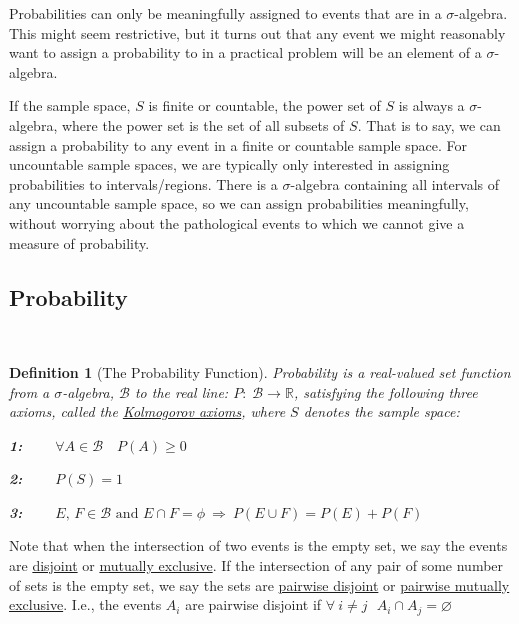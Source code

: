 \documentclass[12pt,a4paper]{article}
\newtheorem{defn}[thm]{Definition}
\begin{document}
Probabilities can only be meaningfully assigned to events that are in a $\sigma$-algebra. This might seem restrictive, but it turns out that any event we might reasonably want to assign a probability to in a practical problem will be an element of a $\sigma$-algebra.

If the sample space, $S$ is finite or countable, the power set of $S$ is always a $\sigma$-algebra, where the power set is the set of all subsets of $S$. That is to say, we can assign a probability to any event in a finite or countable sample space. For uncountable sample spaces, we are typically only interested in assigning probabilities to intervals/regions. There is a $\sigma$-algebra containing all intervals of any uncountable sample space, so we can assign probabilities meaningfully, without worrying about the pathological events to which we cannot give a measure of probability.\par
\vspace{12pt}


\subsection{Probability}$\;$

\begin{defn}[The Probability Function]

Probability is a real-valued set function from a $\sigma$-algebra, $\mathcal{B}$ to the real line: $P:\;\mathcal{B}\rightarrow\mathbb{R}$, satisfying the following three axioms, called the \underline{Kolmogorov axioms}, where $S$ denotes the sample space:\par
\vspace{1pt}
\textbf{1:} $\qquad\forall A\in\mathcal{B}\quad P(A)\geq 0$\par
\vspace{10pt}
\textbf{2:} $\qquad P(S)=1$\par
\vspace{10pt}
\textbf{3:} $\qquad E,\, F\in\mathcal{B}\text{ and }E\cap F=\phi\:\Rightarrow\: P(E\cup F)=P(E)+P(F)$
\end{defn}

Note that when the intersection of two events is the empty set, we say the events are \underline{disjoint} or \underline{mutually exclusive}. If the intersection of any pair of some number of sets is the empty set, we say the sets are \underline{pairwise disjoint} or \underline{pairwise mutually exclusive}. I.e., the events $A_i$ are pairwise disjoint if $\forall \:i\neq j \:\:\:A_i\cap A_j = \varnothing$
\end{document}
